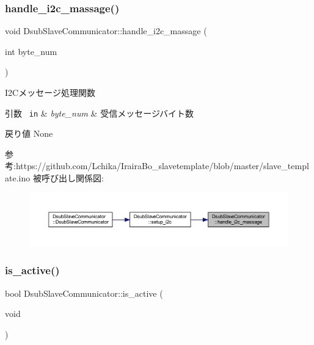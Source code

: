 \subsubsection{\texorpdfstring{handle\_i2c\_massage()}{handle\_i2c\_massage()}}
{\footnotesize\ttfamily void Dsub\+Slave\+Communicator\+::handle\+\_\+i2c\+\_\+massage (\begin{DoxyParamCaption}\item[{int}]{byte\+\_\+num }\end{DoxyParamCaption})\hspace{0.3cm}{\ttfamily [static]}}



I2\+Cメッセージ処理関数 


\begin{DoxyParams}[1]{引数}
\mbox{\texttt{ in}}  & {\em byte\+\_\+num} & 受信メッセージバイト数 \\
\hline
\end{DoxyParams}
\begin{DoxyReturn}{戻り値}
None
\end{DoxyReturn}
参考\+:https\+://github.com/\+Lchika/\+Iraira\+Bo\+\_\+slavetemplate/blob/master/slave\+\_\+template.\+ino 被呼び出し関係図\+:
\nopagebreak
\begin{figure}[H]
\begin{center}
\leavevmode
\includegraphics[width=350pt]{class_dsub_slave_communicator_a0bec7ba63d137c6b50b1c7f651792deb_icgraph}
\end{center}
\end{figure}
\mbox{\label{class_dsub_slave_communicator_a7a7d6e43b95833e698761442b0741e72}} 
\subsubsection{\texorpdfstring{is\_active()}{is\_active()}}
{\footnotesize\ttfamily bool Dsub\+Slave\+Communicator\+::is\+\_\+active (\begin{DoxyParamCaption}\item[{void}]{ }\end{DoxyParamCaption})\hspace{0.3cm}{\ttfamily [static]}}



